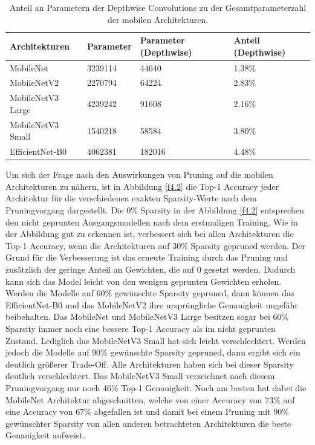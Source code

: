 \begin{table}[ht]
\centering
\begin{tabular}{llll}
\toprule
    Architekturen & Parameter & Parameter (Depthwise) & Anteil (Depthwise) \\
\midrule
        MobileNet &   3239114 &                 44640 &              1.38\% \\
      MobileNetV2 &   2270794 &                 64224 &              2.83\% \\
MobileNetV3 Large &   4239242 &                 91608 &              2.16\% \\
MobileNetV3 Small &   1540218 &                 58584 &              3.80\% \\
  EfficientNet-B0 &   4062381 &                182016 &              4.48\% \\
\bottomrule
\end{tabular}
\caption{Anteil an Parametern der Depthwise Convolutions zu der Gesamtparameterzahl der mobilen Architekturen.}
\label{t4.4}
\end{table}

Um sich der Frage nach den Auswirkungen von Pruning auf die mobilen Architekturen zu nähern, ist in Abbildung \ref{f4.2} die Top-1 Accuracy jeder Architektur für die verschiedenen exakten Sparsity-Werte nach dem Pruningvorgang dargestellt. Die $0\%$ Sparsity in der Abbildung \ref{f4.2} entsprechen den nicht geprunten Ausgangsmodellen nach dem erstmaligen Training. Wie in der Abbildung gut zu erkennen ist, verbessert sich bei allen Architekturen die Top-1 Accuracy, wenn die Architekturen auf $30\%$ Sparsity gepruned werden. Der Grund für die Verbesserung ist das erneute Training durch das Pruning und zusätzlich der geringe Anteil an Gewichten, die auf 0 gesetzt werden. Dadurch kann sich das Model leicht von den wenigen geprunten Gewichten erholen. Werden die Modelle auf $60\%$ gewünschte Sparsity gepruned, dann können das EfficientNet-B0 und das MobileNetV2 ihre ursprüngliche Genauigkeit ungefähr beibehalten. Das MobileNet und MobileNetV3 Large besitzen sogar bei $60\%$ Sparsity immer noch eine bessere Top-1 Accuracy als im nicht geprunten Zustand. Lediglich das MobileNetV3 Small hat sich leicht verschlechtert. Werden jedoch die Modelle auf $90\%$ gewünschte Sparsity gepruned, dann ergibt sich ein deutlich größerer Trade-Off. Alle Architekturen haben sich bei dieser Sparsity deutlich verschlechtert. Das MobileNetV3 Small verzeichnet nach diesem Pruningvorgang nur noch $46\%$ Top-1 Genauigkeit. Noch am besten hat dabei die MobileNet Architektur abgeschnitten, welche von einer Accuracy von $73\%$ auf eine Accuracy von $67\%$ abgefallen ist und damit bei einem Pruning mit $90\%$ gewünschter Sparsity von allen anderen betrachteten Architekturen die beste Genauigkeit aufweist.

